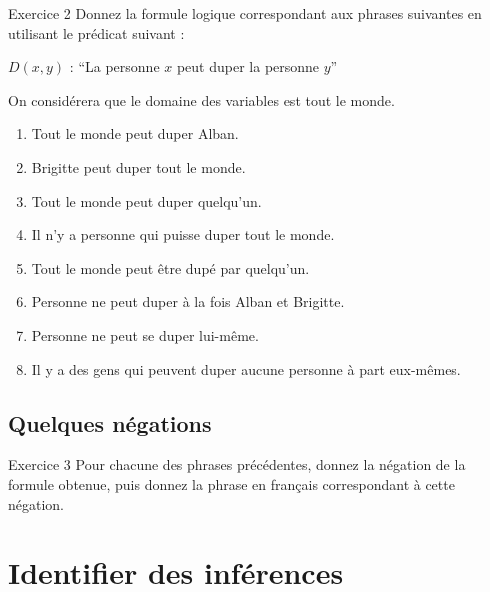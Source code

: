\documentclass[a4paper,11pt]{article}
\begin{document}
\begin{exercisebox}{Exercice 2}
Donnez la formule logique correspondant aux phrases suivantes en utilisant le prédicat suivant : 

$D(x, y)$ : ``La personne $x$ peut duper la personne $y$''

On considérera que le domaine des variables est tout le monde.

\begin{enumerate}
    \item Tout le monde peut duper Alban.
    \item Brigitte peut duper tout le monde.
    \item Tout le monde peut duper quelqu'un.
    \item Il n'y a personne qui puisse duper tout le monde.
    \item Tout le monde peut être dupé par quelqu'un.
    \item Personne ne peut duper à la fois Alban et Brigitte.
    \item Personne ne peut se duper lui-même.
    \item Il y a des gens qui peuvent duper aucune personne à part eux-mêmes.
\end{enumerate}
\end{exercisebox}

\subsection{Quelques négations}

\begin{exercisebox}{Exercice 3}
Pour chacune des phrases précédentes, donnez la négation de la formule obtenue, puis donnez la phrase en français correspondant à cette négation.
\end{exercisebox}

\section{Identifier des inférences}
\end{document}
